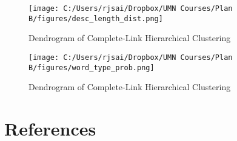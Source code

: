 \documentclass[]{article}
\begin{document}
\begin{figure}
\centering
\texttt{[image: C:/Users/rjsai/Dropbox/UMN Courses/Plan B/figures/desc\_length\_dist.png]}
\caption{Dendrogram of Complete-Link Hierarchical Clustering}
\end{figure}

\begin{figure}
\centering
\texttt{[image: C:/Users/rjsai/Dropbox/UMN Courses/Plan B/figures/word\_type\_prob.png]}
\caption{Dendrogram of Complete-Link Hierarchical Clustering}
\end{figure}

\newpage

\section{References}\label{references}

\renewcommand{\section}[2]{}%
\end{document}
